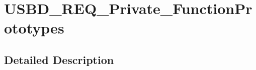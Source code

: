 \hypertarget{group___u_s_b_d___r_e_q___private___function_prototypes}{\section{U\-S\-B\-D\-\_\-\-R\-E\-Q\-\_\-\-Private\-\_\-\-Function\-Prototypes}
\label{group___u_s_b_d___r_e_q___private___function_prototypes}
}


\subsection{Detailed Description}
